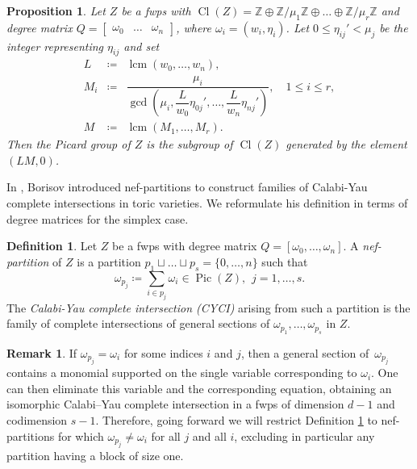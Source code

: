 \documentclass{amsart}
\DeclareMathOperator{\Cl}{Cl}
\DeclareMathOperator{\Pic}{Pic}
\DeclareMathOperator{\lcm}{lcm}
\newcommand{\Z}{\mathbb{Z}}
\newtheorem{proposition}[lem]{Proposition}
\theoremstyle{definition}
\newtheorem{definition}[lem]{Definition}
\newtheorem{remark}[lem]{Remark}
\begin{document}
\begin{proposition} \label{prop:pic}
    Let $Z$ be a fwps with $\Cl(Z)=\Z\oplus \Z/\mu_1\Z\oplus\dots\oplus\Z/\mu_r\Z$ and degree matrix $Q=\begin{bmatrix}
        \omega_0 & \dots & \omega_n
    \end{bmatrix}$, where $\omega_i=(w_i,\eta_i)$.
    Let $0\leq\eta_{ij}'<\mu_j$ be the integer representing $\eta_{ij}$ and set
    \[
    \begin{array}{lcll}  
    L & \coloneqq & \lcm(w_0,\dots,w_n),
    \\[6pt]
    M_i & \coloneqq & \dfrac{\mu_i}{\gcd\left(\mu_i,\dfrac{L}{w_0}\eta_{0j}',\dots,\dfrac{L}{w_n}\eta_{nj}'\right)}, \quad 1 \le i \le r,
    \\[24pt]
    M & \coloneqq & \lcm(M_1,\dots,M_r).
    \end{array}
    \] 
    Then the Picard group of $Z$ is the subgroup of $\Cl(Z)$ generated by the element~$(LM,0)$.
\end{proposition}

In \cite{Bor}, Borisov introduced nef-partitions to construct families of Calabi-Yau complete intersections in toric varieties. We reformulate his definition in terms of degree matrices for the simplex case.

\begin{definition}\label{def:nef-part}
    Let $Z$ be a fwps with degree matrix $Q=[\omega_0,\dots,\omega_n]$. A \emph{nef-partition} of $Z$ is a partition $p_1\sqcup\dots\sqcup p_s=\{0,\dots,n\}$ such that
    $$\omega_{p_j}\coloneq\sum_{i\in p_j}\omega_i\in\Pic(Z), \hspace{5pt} j=1,\dots,s.$$
    The \emph{Calabi-Yau complete intersection (CYCI)} arising from such a partition is the family of complete intersections of general sections of $\omega_{p_1},\dots,\omega_{p_s}$ in $Z$.
\end{definition}

\begin{remark}\label{rem:linear-elimination} 
If $\omega_{p_j}=\omega_i$ for some indices $i$ and $j$, then a general section of~$\omega_{p_j}$ contains a monomial supported on the single
variable corresponding to $\omega_i$.
One can then eliminate this variable and the corresponding equation, obtaining an
isomorphic Calabi--Yau complete intersection in a fwps of dimension $d-1$ and codimension
$s-1$. Therefore, going forward we will restrict Definition \ref{def:nef-part} to nef-partitions for which
$\omega_{p_j}\neq \omega_i$ for all $j$ and all $i$, excluding in particular any partition having a
block of size one.
\end{remark}
\end{document}
